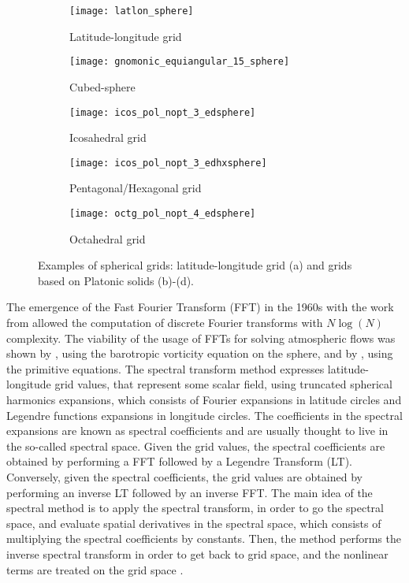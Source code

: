 \begin{figure}
	\centering
	\begin{subfigure}{.3\linewidth}
		\centering
		\texttt{[image: latlon\_sphere]}
		\caption{Latitude-longitude grid}\label{latlon-grid}
	\end{subfigure}%
  \hspace{1em}%
\begin{subfigure}{.3\linewidth}
	\centering
	\texttt{[image: gnomonic\_equiangular\_15\_sphere]}
	\caption{Cubed-sphere}\label{cs-grid}
\end{subfigure}%
	\hspace{2em}%
	\begin{subfigure}{.3\linewidth}
		\centering
		\texttt{[image: icos\_pol\_nopt\_3\_edsphere]}
		\caption{Icosahedral grid}\label{icos-grid}
	\end{subfigure}
	\begin{subfigure}{.3\linewidth}
		\centering
		\texttt{[image: icos\_pol\_nopt\_3\_edhxsphere]}
		\caption{Pentagonal/Hexagonal grid}\label{voronoi-grid}
	\end{subfigure}
	\begin{subfigure}{.3\linewidth}
		\centering
		\texttt{[image: octg\_pol\_nopt\_4\_edsphere]}
		\caption{Octahedral grid}\label{octg-grid}
	\end{subfigure}
	\caption{Examples of spherical grids: latitude-longitude grid (a) and grids based on Platonic solids (b)-(d).}
\end{figure}

The emergence of the Fast Fourier Transform (FFT) in the 1960s with the work from 
\citet{cooley:1965} allowed the computation of discrete Fourier transforms with
$N\log(N)$ complexity. 
The viability of the usage of FFTs for solving atmospheric flows was shown by \citet{orszag:1970},
using the barotropic vorticity equation on the sphere, and by \citet{eliasen:1970}, using
the primitive equations.
The spectral transform method expresses latitude-longitude grid values, that represent some scalar field,
using truncated spherical harmonics expansions, which consists of Fourier expansions 
in latitude circles and Legendre functions expansions in longitude circles. 
The coefficients in the spectral expansions are known
as spectral coefficients and are usually thought to live in the so-called spectral space.
Given the grid values, the spectral coefficients are obtained by performing a FFT followed by a 
Legendre Transform (LT). 
Conversely, given the spectral coefficients,
the grid values are obtained by performing an inverse LT followed by an inverse FFT.
The main idea of the spectral method is to apply the spectral transform, in order to 
go the spectral space, and evaluate spatial derivatives in the spectral space, which
consists of multiplying the spectral coefficients by constants. 
Then, the method performs the inverse spectral transform
in order to get back to grid space, and the nonlinear terms are treated on the grid space
\citep{krishnamurti:2006}.

